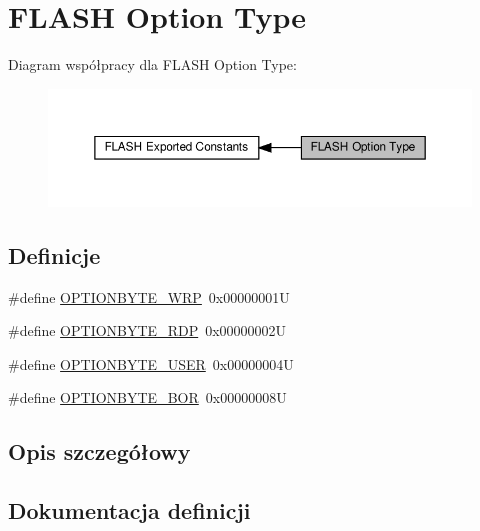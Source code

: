 \hypertarget{group___f_l_a_s_h_ex___option___type}{}\section{F\+L\+A\+SH Option Type}
\label{group___f_l_a_s_h_ex___option___type}
Diagram współpracy dla F\+L\+A\+SH Option Type\+:\nopagebreak
\begin{figure}[H]
\begin{center}
\leavevmode
\includegraphics[width=350pt]{group___f_l_a_s_h_ex___option___type}
\end{center}
\end{figure}
\subsection*{Definicje}
\begin{DoxyCompactItemize}
\item 
\#define \hyperlink{group___f_l_a_s_h_ex___option___type_ga48712a166ea192ddcda0f2653679f9ec}{O\+P\+T\+I\+O\+N\+B\+Y\+T\+E\+\_\+\+W\+RP}~0x00000001U
\item 
\#define \hyperlink{group___f_l_a_s_h_ex___option___type_ga8f0bdb21ef13bae39d5d8b6619e2df06}{O\+P\+T\+I\+O\+N\+B\+Y\+T\+E\+\_\+\+R\+DP}~0x00000002U
\item 
\#define \hyperlink{group___f_l_a_s_h_ex___option___type_gac7d843e666e15c79688a1914e8ffe7a5}{O\+P\+T\+I\+O\+N\+B\+Y\+T\+E\+\_\+\+U\+S\+ER}~0x00000004U
\item 
\#define \hyperlink{group___f_l_a_s_h_ex___option___type_gaf4063216c8386467d187663190936c07}{O\+P\+T\+I\+O\+N\+B\+Y\+T\+E\+\_\+\+B\+OR}~0x00000008U
\end{DoxyCompactItemize}


\subsection{Opis szczegółowy}


\subsection{Dokumentacja definicji}
\mbox{\label{group___f_l_a_s_h_ex___option___type_gaf4063216c8386467d187663190936c07}} 
